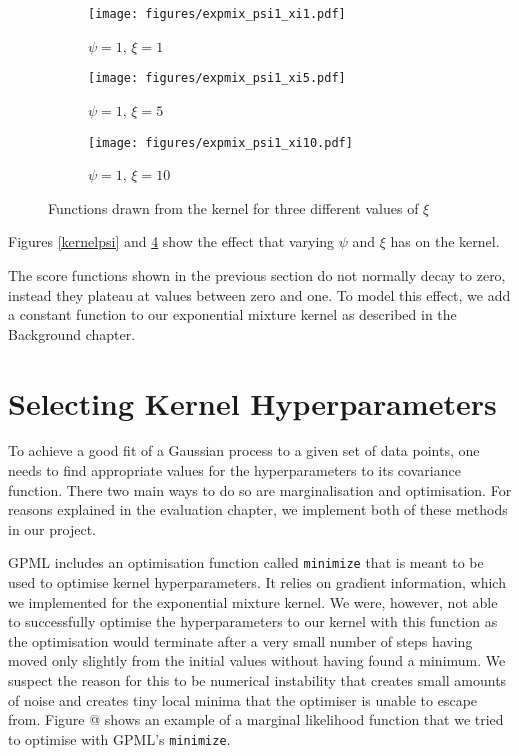 \documentclass[a4paper,12pt,twoside,openright]{report}
\begin{document}
\begin{figure}
\centering
\begin{subfigure}{.33\textwidth}
  \centering
  \texttt{[image: figures/expmix\_psi1\_xi1.pdf]}
  \caption{$\psi=1$, $\xi=1$}
  \label{expmix11_}
\end{subfigure}%
\begin{subfigure}{.33\textwidth}
  \centering
  \texttt{[image: figures/expmix\_psi1\_xi5.pdf]}
  \caption{$\psi=1$, $\xi=5$}
  \label{expmix15}
\end{subfigure}%
\begin{subfigure}{.33\textwidth}
  \centering
  \texttt{[image: figures/expmix\_psi1\_xi10.pdf]}
  \caption{$\psi=1$, $\xi=10$}
  \label{expmix110}
\end{subfigure}
\caption{Functions drawn from the kernel for three different values of $\xi$}
\label{kernelxi}
\end{figure}

Figures \ref{kernelpsi} and \ref{kernelxi} show the effect that varying $\psi$ and $\xi$ has on the kernel.

The score functions shown in the previous section do not normally decay to zero, instead they plateau at values between zero and one. To model this effect, we add a constant function to our exponential mixture kernel as described in the Background chapter.

\section{Selecting Kernel Hyperparameters} 


To achieve a good fit of a Gaussian process to a given set of data points, one needs to find appropriate values for the hyperparameters to its covariance function. There two main ways to do so are marginalisation and optimisation. For reasons explained in the evaluation chapter, we implement both of these methods in our project.

GPML includes an optimisation function called \texttt{minimize} that is meant to be used to optimise kernel hyperparameters. It relies on gradient information, which we implemented for the exponential mixture kernel. We were, however, not able to successfully optimise the hyperparameters to our kernel with this function as the optimisation would terminate after a very small number of steps having moved only slightly from the initial values without having found a minimum. We suspect the reason for this to be numerical instability that creates small amounts of noise and creates tiny local minima that the optimiser is unable to escape from. Figure @ shows an example of a marginal likelihood function that we tried to optimise with GPML's \texttt{minimize}.
\end{document}
